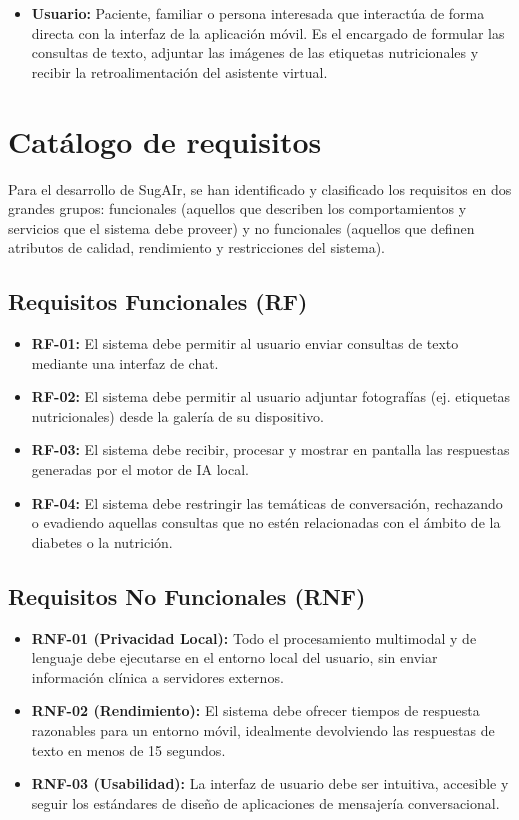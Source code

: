 \begin{itemize}
    \item \textbf{Usuario:} Paciente, familiar o persona interesada que interactúa de forma directa con la interfaz de la aplicación móvil. Es el encargado de formular las consultas de texto, adjuntar las imágenes de las etiquetas nutricionales y recibir la retroalimentación del asistente virtual.
\end{itemize}

\section{Catálogo de requisitos}

Para el desarrollo de SugAIr, se han identificado y clasificado los requisitos en dos grandes grupos: funcionales (aquellos que describen los comportamientos y servicios que el sistema debe proveer) y no funcionales (aquellos que definen atributos de calidad, rendimiento y restricciones del sistema).

\subsection*{Requisitos Funcionales (RF)}
\begin{itemize}
    \item \textbf{RF-01:} El sistema debe permitir al usuario enviar consultas de texto mediante una interfaz de chat.
    \item \textbf{RF-02:} El sistema debe permitir al usuario adjuntar fotografías (ej. etiquetas nutricionales) desde la galería de su dispositivo.
    \item \textbf{RF-03:} El sistema debe recibir, procesar y mostrar en pantalla las respuestas generadas por el motor de IA local.
    \item \textbf{RF-04:} El sistema debe restringir las temáticas de conversación, rechazando o evadiendo aquellas consultas que no estén relacionadas con el ámbito de la diabetes o la nutrición.
\end{itemize}

\subsection*{Requisitos No Funcionales (RNF)}
\begin{itemize}
    \item \textbf{RNF-01 (Privacidad Local):} Todo el procesamiento multimodal y de lenguaje debe ejecutarse en el entorno local del usuario, sin enviar información clínica a servidores externos.
    \item \textbf{RNF-02 (Rendimiento):} El sistema debe ofrecer tiempos de respuesta razonables para un entorno móvil, idealmente devolviendo las respuestas de texto en menos de 15 segundos.
    \item \textbf{RNF-03 (Usabilidad):} La interfaz de usuario debe ser intuitiva, accesible y seguir los estándares de diseño de aplicaciones de mensajería conversacional.
\end{itemize}

